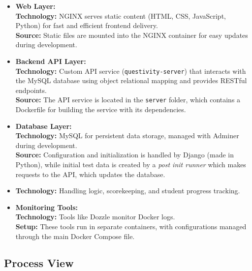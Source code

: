 \documentclass[12pt]{article}
\begin{document}
\begin{itemize}
    \item \textbf{Web Layer:}\\
    \textbf{Technology:} NGINX serves static content (HTML, CSS, JavaScript, Python) for fast and efficient frontend delivery.\\
    \textbf{Source:} Static files are mounted into the NGINX container for easy updates during development.

    \item \textbf{Backend API Layer:}\\
    \textbf{Technology:} Custom API service (\texttt{questivity-server}) that interacts with the MySQL database using object relational mapping and provides RESTful endpoints.\\
    \textbf{Source:} The API service is located in the \texttt{server} folder, which contains a Dockerfile for building the service with its dependencies.

    \item \textbf{Database Layer:}\\
    \textbf{Technology:} MySQL for persistent data storage, managed with Adminer during development.\\
    \textbf{Source:} Configuration and initialization is handled by Django (made in Python), while initial test data is created by a \textit{post init runner} which makes requests to the API, which updates the database.

    \item \textbf{Technology:} Handling logic, scorekeeping, and student progress tracking.

    \item \textbf{Monitoring Tools:}\\
    \textbf{Technology:} Tools like Dozzle monitor Docker logs.\\
    \textbf{Setup:} These tools run in separate containers, with configurations managed through the main Docker Compose file.
\end{itemize}

\subsection{Process View}
\end{document}
